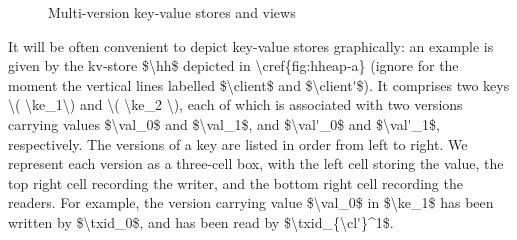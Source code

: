 \begin{figure}[t]
\begin{center}
\begin{onethirdsubfig}
\caption{A view for client \( \cl' \)}
\label{fig:view-of-cl-prime}
\end{onethirdsubfig}

\end{center}

\hrulefill

\caption{Multi-version key-value stores and views}
\label{fig:hheap}
\label{fig:key-value-and-view}
\end{figure}
\ac{
It will be often convenient to depict key-value stores graphically: an 
example is given by the kv-store $\hh$ depicted in \cref{fig:hheap-a}
(ignore for the moment the vertical lines labelled $\client$ and $\client'$).
It comprises two keys \( \ke_1\) and \( \ke_2 \), 
each of which is associated with two versions carrying values $\val_0$ and $\val_1$, and $\val'_0$ and $\val'_1$, respectively.
The versions of a key are listed in order from left to right. 
We represent each version as a three-cell box, with the left cell storing the value, the top right cell recording the writer, and the bottom right cell recording the readers. 
For example, the version carrying value $\val_0$ in $\ke_1$ has been written by $\txid_0$, and has been read by $\txid_{\cl'}^1$.
}


